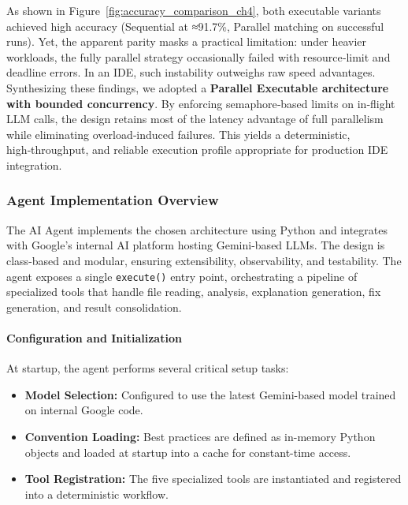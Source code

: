 \begin{spacing}{1.2}
As shown in Figure~\ref{fig:accuracy_comparison_ch4}, both executable variants achieved high accuracy (Sequential at ≈91.7\%, Parallel matching on successful runs). Yet, the apparent parity masks a practical limitation: under heavier workloads, the fully parallel strategy occasionally failed with resource‑limit and deadline errors. In an IDE, such instability outweighs raw speed advantages.\\

Synthesizing these findings, we adopted a \textbf{Parallel Executable architecture with bounded concurrency}. By enforcing semaphore‑based limits on in‑flight LLM calls, the design retains most of the latency advantage of full parallelism while eliminating overload‑induced failures. This yields a deterministic, high‑throughput, and reliable execution profile appropriate for production IDE integration.

\subsubsection{Agent Implementation Overview}
The AI Agent implements the chosen architecture using Python and integrates with Google’s internal AI platform 
hosting Gemini-based LLMs. The design is class-based and modular, ensuring extensibility, observability, and testability.  
The agent exposes a single \texttt{execute()} entry point, orchestrating a pipeline of specialized tools that handle 
file reading, analysis, explanation generation, fix generation, and result consolidation.

\paragraph{Configuration and Initialization}
At startup, the agent performs several critical setup tasks:
\begin{itemize}
    \item \textbf{Model Selection:} Configured to use the latest Gemini-based model trained on internal Google code.
    \item \textbf{Convention Loading:} Best practices are defined as in-memory Python objects and loaded at startup into a cache for constant-time access.
    \item \textbf{Tool Registration:} The five specialized tools are instantiated and registered into a deterministic workflow.
\end{itemize}


\end{spacing}
